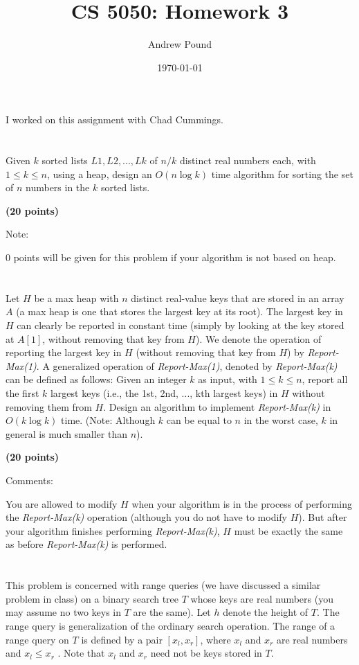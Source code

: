 \documentclass{article}
\title{CS 5050: Homework 3}
\author{Andrew Pound}
\date{\today}
\begin{document}
\maketitle

I worked on this assignment with Chad Cummings.
\section{}
Given $k$ sorted lists $L1, L2, . . . , Lk$ of $n/k$ distinct real
numbers each, with $1 \le k \le n$, using a heap, design an $O(n \log
k)$ time algorithm for sorting the set of $n$ numbers in the $k$
sorted  lists. {\bf (20 points)

Note:} 0 points will be given for this problem if your algorithm is
not based on heap. 

\section{}
 Let $H$ be a max heap with $n$ distinct real-value keys that are
 stored in an array $A$ (a max heap is one that stores the largest key
 at its root). The largest key in $H$ can clearly be reported in
 constant time (simply by looking at the key stored at $A[1]$, without
 removing that key from $H$). We denote the operation of reporting the
 largest key in $H$ (without removing that key from $H$) by
 \emph{Report-Max(1)}. A generalized operation of
 \emph{Report-Max(1)}, denoted by \emph{Report-Max(k)} can be defined
 as follows: Given an integer $k$ as input, with $1 \le k \le n$,
 report all the first $k$ largest keys (i.e., the 1st, 2nd, ..., kth
 largest keys) in $H$ without removing them from $H$. Design an
 algorithm to implement \emph{Report-Max(k)} in $O(k\log k)$
 time. (Note: Although $k$ can be equal to $n$ in the worst case, $k$
 in general is much smaller than $n$). {\bf (20 points)

Comments:} You are allowed to modify $H$ when your algorithm is in the
process of performing the \emph{Report-Max(k)} operation (although you
do not have to modify $H$). But after your algorithm finishes
performing \emph{Report-Max(k)}, $H$ must be exactly the same as
before \emph{Report-Max(k)} is performed.

\section{}

 This problem is concerned with range queries (we have discussed a
 similar problem in class) on a binary search tree $T$ whose keys are
 real numbers (you may assume no two keys in $T$ are the same). Let
 $h$ denote the height of $T$. The range query is generalization of
 the ordinary search operation. The range of a range query on $T$ is
 defined by a pair $[x_l ,x_r ]$, where $x_l$ and $x_r$ are real
 numbers and $x_l \le x_r$ . Note that $x_l$ and $x_r$ need not be
 keys stored in $T$. 
\end{document}
